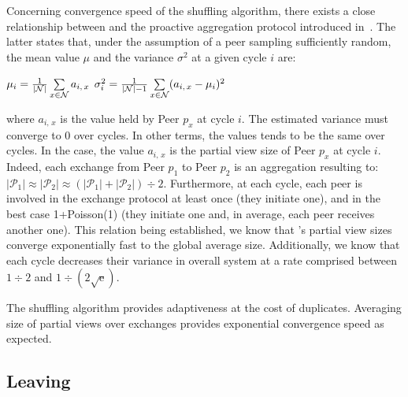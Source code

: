 Concerning convergence speed of the shuffling algorithm, there exists
a close relationship between \SPRAY and the proactive aggregation
protocol introduced
in~\cite{jelasity2004epidemic,montresor2004robust}. The latter states
that, under the assumption of a peer sampling sufficiently random, the
mean value $\mu$ and the variance $\sigma^2$ at a given cycle $i$ are:
\begin{center}
  $\mu_i = {1\over{|\mathcal{N}|}} \sum\limits_{x \in \mathcal{N}} a_{i,\,x}$
  \hfill
  $\sigma^2_i = {1\over{|\mathcal{N}|-1}}\sum\limits_{x \in \mathcal{N}}
  (a_{i,\,x} - \mu_i)^2$
\end{center}
where $a_{i,\,x}$ is the value held by Peer $p_x$ at cycle $i$. The estimated
variance must converge to $0$ over cycles. In other terms, the values tends to
be the same over cycles. In the \SPRAY case, the value $a_{i,\,x}$ is the
partial view size of Peer $p_x$ at cycle $i$. Indeed, each exchange from Peer
$p_1$ to Peer $p_2$ is an aggregation resulting to:
$|\mathcal{P}_1|\approx|\mathcal{P}_2|\approx{(|\mathcal{P}_1| +
  |\mathcal{P}_2|) \div 2}$.
Furthermore, at each cycle, each peer is involved in the exchange protocol at
least once (they initiate one), and in the best case 1+Poisson(1) (they
initiate one and, in average, each peer receives another one). This relation
being established, we know that \SPRAY's partial view sizes converge
exponentially fast to the global average size. Additionally, we know that each
cycle decreases their variance in overall system at a rate comprised between
${1\div 2}$ and $1\div ({2\sqrt{\text{e}}})$.

The shuffling algorithm provides adaptiveness at the cost of
duplicates. Averaging size of partial views over exchanges provides exponential
convergence speed as expected.

\subsection{Leaving}
\label{subsec:leaving}

